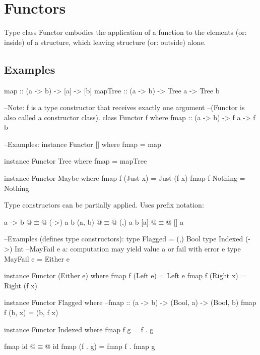 
\section{Functors}
Type class Functor embodies the application of a function to the elements (or: inside) of a structure, which leaving structure (or: outside) alone.

\subsection{Examples}
\begin{Haskell}
map :: (a -> b) -> [a] -> [b]
mapTree :: (a -> b) -> Tree a -> Tree b

--Note: f is a type constructor that receives exactly one argument
--(Functor is also called a constructor class).
class Functor f where
   fmap :: (a -> b) -> f a -> f b
   
--Examples:
instance Functor [] where
   fmap = map
   
instance Functor Tree where
   fmap = mapTree
   
instance Functor Maybe where
   fmap f (Just x) = Just (f x)
   fmap f Nothing  = Nothing
\end{Haskell}

\begin{minipage}{\textwidth}
Type constructors can be partially applied. Uses prefix notation:\\
\begin{Haskell}
a -> b @$\equiv$@ (->) a b
(a, b) @$\equiv$@ (,) a b
[a] @$\equiv$@ [] a

--Examples (defines type constructors):
type Flagged = (,) Bool
type Indexed (->) Int
--MayFail e a: computation may yield value a or fail with error e
type MayFail e = Either e

instance Functor (Either e) where
   fmap f (Left e)  = Left e
   fmap f (Right x) = Right (f x)
   
instance Functor Flagged where
--fmap :: (a -> b) -> (Bool, a) -> (Bool, b)
   fmap f (b, x) = (b, f x)
   
instance Functor Indexed where
   fmap f g = f . g

fmap id @$\equiv$@ id
fmap (f . g) = fmap f . fmap g
\end{Haskell}
\end{minipage}

